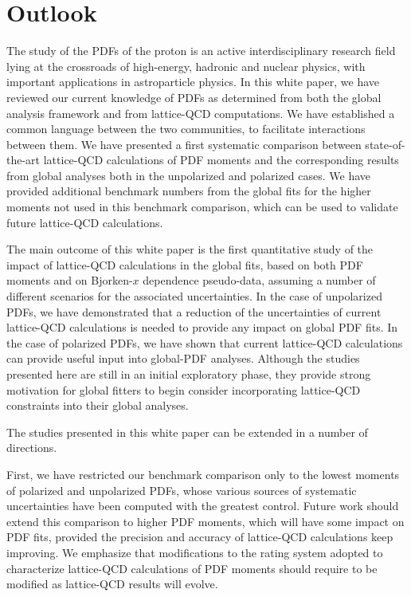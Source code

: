 \section{Outlook}
\label{sec:outlook}

The study of the PDFs of the proton is an active interdisciplinary research 
field lying at the crossroads of high-energy, hadronic and nuclear physics, 
with important applications in astroparticle physics.
%
In this white paper, we have reviewed our current knowledge of PDFs as
determined from both the global analysis framework
and from lattice-QCD computations. 
%
We have established a common language between the two communities, 
to facilitate interactions between them.
%
We have presented a first systematic comparison between state-of-the-art 
lattice-QCD calculations of PDF moments and the corresponding results from
global analyses both in the unpolarized and polarized cases.
%
We have provided additional benchmark numbers from the global fits 
for the higher moments not used in this benchmark comparison, which can be
used to validate future lattice-QCD calculations.

The main outcome of this white paper is the first
quantitative study of the impact of lattice-QCD calculations
in the global fits, based on both PDF moments and on Bjorken-$x$ dependence 
pseudo-data, assuming a number of different scenarios for
the associated uncertainties.
%
In the case of unpolarized PDFs, we have demonstrated that a reduction 
of the uncertainties of current lattice-QCD calculations is needed 
to provide any impact on global PDF fits.
%
In the case of polarized PDFs, we have shown that current lattice-QCD
calculations can provide useful input into global-PDF analyses.
%
Although the studies presented here are still in an initial exploratory phase, 
they provide strong motivation for global fitters to begin consider 
incorporating lattice-QCD constraints into their global analyses.

The studies presented in this white paper can be extended in a number of 
directions.

First, we have restricted our benchmark comparison only to the lowest moments 
of polarized and unpolarized PDFs, whose various sources of systematic 
uncertainties have been computed with the greatest control.
%
Future work should extend this comparison to higher PDF moments,
which will have some impact on PDF fits, provided the precision and accuracy
of lattice-QCD calculations keep improving.
%
We emphasize that modifications to the rating system adopted to
characterize  lattice-QCD calculations of PDF moments should require to 
be modified as lattice-QCD results will evolve.

